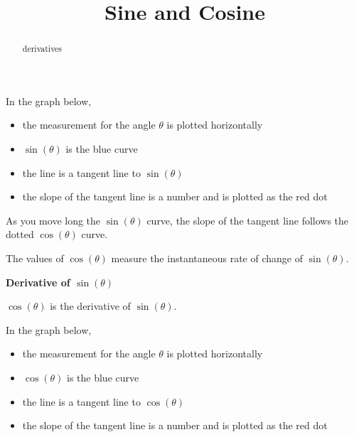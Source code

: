 \documentclass{ximera}
\title{Sine and Cosine}
\begin{document}
\begin{abstract}
derivatives
\end{abstract}
\maketitle








In the graph below, 

\begin{itemize}
\item the measurement for the angle $\theta$ is plotted horizontally
\item $\sin(\theta)$ is the blue curve
\item the line is a tangent line to $\sin(\theta)$
\item the slope of the tangent line is a number and is plotted as the red dot
\end{itemize}

As you move long the $\sin(\theta)$ curve, the slope of the tangent line follows the dotted $\cos(\theta)$ curve.



\begin{center}
\end{center}



The values of $\cos(\theta)$ measure the instantaneous rate of change of $\sin(\theta)$.



\begin{theorem}  \textbf{\textcolor{green!50!black}{Derivative of $\sin(\theta)$}}

\begin{center}
$\cos(\theta)$ is the derivative of $\sin(\theta)$.  
\end{center}

\end{theorem}















In the graph below, 

\begin{itemize}
\item the measurement for the angle $\theta$ is plotted horizontally
\item $\cos(\theta)$ is the blue curve
\item the line is a tangent line to $\cos(\theta)$
\item the slope of the tangent line is a number and is plotted as the red dot
\end{itemize}
\end{document}
